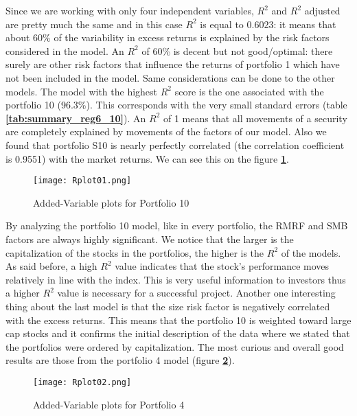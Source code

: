 \documentclass[11pt]{article}
\begin{document}
Since we are working with only four independent variables, $R^2$ and $R^2$ adjusted are pretty much the same and in this case $R^2$ is equal to 0.6023: 
it means that about 60\% of the variability in excess returns is explained by the risk factors considered in the model. An $R^2$ of 60\% is decent but not good/optimal: 
there surely are other risk factors that influence the returns of portfolio 1 which have not been included in the model. Same considerations can be done to the other models. 
The model with the highest $R^2$ score is the one associated with the portfolio 10 (96.3\%). This corresponds with the very small standard errors (table \textbf{\ref{tab:summary_reg6_10}}).
An $R^2$ of 1 means that all movements of a security are completely explained by movements of the factors of our model. 
Also we found that portfolio S10 is nearly perfectly correlated (the correlation coefficient is 0.9551) with the market returns. We can see this on the figure \textbf{\ref{fig:add_v_p10}}.
\begin{figure}[H]
    \begin{center}
        \texttt{[image: Rplot01.png]}
    \end{center}
    \caption{Added-Variable plots for Portfolio 10}
    \label{fig:add_v_p10}
\end{figure}
\clearpage
By analyzing the portfolio 10 model, like in every portfolio, the RMRF and SMB factors are always highly significant. We notice that the larger is the capitalization 
of the stocks in the portfolios, the higher is the $R^2$ of the models. As said before, a high $R^2$ value indicates that the stock’s performance moves relatively in 
line with the index. This is very useful information to investors thus a higher $R^2$ value is necessary for a successful project. 
Another one interesting thing about the last model is that the size risk factor is negatively correlated with the excess returns. This means that the portfolio 
10 is weighted toward large cap stocks and it confirms the initial description of the data where we stated that the portfolios were ordered by capitalization.
The most curious and overall good results are those from the portfolio 4 model (figure \textbf{\ref{fig:add_v_p4}}). 
\begin{figure}[H]
    \begin{center}
        \texttt{[image: Rplot02.png]}
    \end{center}
    \caption{Added-Variable plots for Portfolio 4}
    \label{fig:add_v_p4}
\end{figure}
\end{document}
